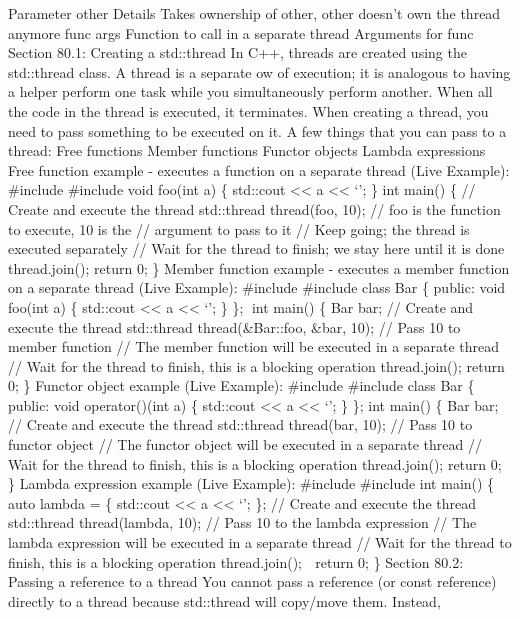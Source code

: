Parameter other Details Takes ownership of other, other doesn't own the
thread anymore func args Function to call in a separate thread Arguments
for func Section 80.1: Creating a std::thread In C++, threads are
created using the std::thread class. A thread is a separate ow of
execution; it is analogous to having a helper perform one task while you
simultaneously perform another. When all the code in the thread is
executed, it terminates. When creating a thread, you need to pass
something to be executed on it. A few things that you can pass to a
thread: Free functions Member functions Functor objects Lambda
expressions Free function example - executes a function on a separate
thread (Live Example): \#include \#include void foo(int a) \{ std::cout
\textless\textless{} a \textless\textless{} `\n'; \} int main() \{ //
Create and execute the thread std::thread thread(foo, 10); // foo is the
function to execute, 10 is the // argument to pass to it // Keep going;
the thread is executed separately // Wait for the thread to finish; we
stay here until it is done thread.join(); return 0; \} Member function
example - executes a member function on a separate thread (Live
Example): \#include \#include class Bar \{ public: void foo(int a) \{
std::cout \textless\textless{} a \textless\textless{} `\n'; \} \}; int
main() \{ Bar bar; // Create and execute the thread std::thread
thread(\&Bar::foo, \&bar, 10); // Pass 10 to member function // The
member function will be executed in a separate thread // Wait for the
thread to finish, this is a blocking operation thread.join(); return 0;
\} Functor object example (Live Example): \#include \#include class Bar
\{ public: void operator()(int a) \{ std::cout \textless\textless{} a
\textless\textless{} `\n'; \} \}; int main() \{ Bar bar; // Create and
execute the thread std::thread thread(bar, 10); // Pass 10 to functor
object // The functor object will be executed in a separate thread //
Wait for the thread to finish, this is a blocking operation
thread.join(); return 0; \} Lambda expression example (Live Example):
\#include \#include int main() \{ auto lambda = \href{int\%20a}{} \{
std::cout \textless\textless{} a \textless\textless{} `\n'; \}; //
Create and execute the thread std::thread thread(lambda, 10); // Pass 10
to the lambda expression // The lambda expression will be executed in a
separate thread // Wait for the thread to finish, this is a blocking
operation thread.join();  return 0; \} Section 80.2: Passing a
reference to a thread You cannot pass a reference (or const reference)
directly to a thread because std::thread will copy/move them. Instead,
